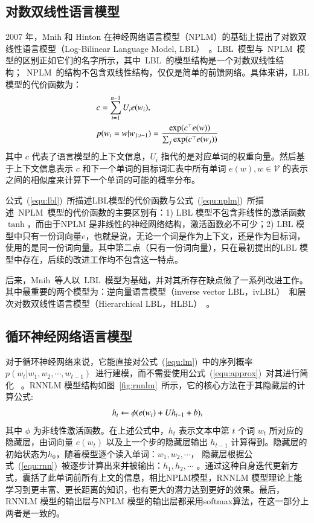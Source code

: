 \subsection{对数双线性语言模型}
2007 年，Mnih 和 Hinton 在神经网络语言模型（NPLM）的基础上提出了对数双线性语言模型（Log-Bilinear Language Model, LBL）~。LBL~模型与~NPLM~模型的区别正如它们的名字所示，其中~LBL~的模型结构是一个对数双线性结构；~NPLM~的结构不包含双线性结构，仅仅是简单的前馈网络。具体来讲，LBL 模型的代价函数为：
\begin{equation}
\setlength{\abovedisplayskip}{6pt}
\setlength{\belowdisplayskip}{6pt}
\label{equ:lbl}
\begin{split}
   &c=\sum_{i=1}^{n-1}{U_i e({w_i})}, \\
   &p(w_t=w|w_{1:t-1})=\frac{\exp(c^\top e(w))}{\sum_j{\exp(c^\top e(w_j))}}
\end{split}
\end{equation}
其中 $c$ 代表了语言模型的上下文信息，$U_i$ 指代的是对应单词的权重向量。然后基于上下文信息表示 $c$ 和下一个单词的目标词汇表中所有单词 $e(w),w\in \mathcal{V}$ 的表示之间的相似度来计算下一个单词的可能的概率分布。

公式~(\ref{equ:lbl})~所描述LBL模型的代价函数与公式~(\ref{equ:nplm})~所描述~NPLM~模型的代价函数的主要区别有：1) LBL 模型不包含非线性的激活函数$\tanh$，而由于NPLM 是非线性的神经网络结构，激活函数必不可少；2) LBL 模型中只有一份词向量$e$，也就是说，无论一个词是作为上下文，还是作为目标词，使用的是同一份词向量。其中第二点（只有一份词向量），只在最初提出的LBL 模型中存在，后续的改进工作均不包含这一特点。

后来，Mnih~等人以~LBL~模型为基础，并对其所存在缺点做了一系列改进工作。其中最重要的两个模型为：逆向量语言模型（inverse vector LBL，ivLBL）~和层次对数双线性语言模型（Hierarchical LBL，HLBL）~。

\subsection{循环神经网络语言模型}
对于循环神经网络来说，它能直接对公式~(\ref{equ:lm})~中的序列概率~$p(w_t | w_1,w_2,\cdots,w_{t-1})$~进行建模，而不需要使用公式~(\ref{equ:approx})~对其进行简化~ 。RNNLM 模型结构如图~\ref{fig:rnnlm}~所示，它的核心方法在于其隐藏层的计算公式:
\begin{equation}
\setlength{\abovedisplayskip}{6pt}
\setlength{\belowdisplayskip}{6pt}
\label{equ:rnn}
  h_t \leftarrow  \phi(e(w_t) + U h_{t-1} +b),
\end{equation}
其中 $\phi$ 为非线性激活函数。在上述公式中，$h_t$ 表示文本中第 $t$ 个词 $w_t$ 所对应的隐藏层，由词向量 $e(w_t)$ 以及上一个步的隐藏层输出 $h_{t -1}$ 计算得到。隐藏层的初始状态为$h_0$，随着模型逐个读入单词：$w_1,w_2,\cdots$， 隐藏层根据公式~(\ref{equ:rnn})~被逐步计算出来并被输出：$h_1,h_2,\cdots$ 。通过这种自身迭代更新方式，囊括了此单词前所有上文的信息，相比NPLM模型，RNNLM 模型理论上能学习到更丰富、更长距离的知识，也有更大的潜力达到更好的效果。最后，RNNLM 模型的输出层与NPLM 模型的输出层都采用softmax算法，在这一部分上两者是一致的。

